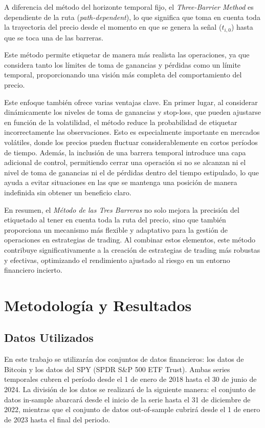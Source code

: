 \documentclass[a4paper,12pt, twoside]{report}
\begin{document}
A diferencia del método del horizonte temporal fijo, el \textit{Three-Barrier Method} 
es dependiente de la ruta (\textit{path-dependent}), lo que significa que toma en cuenta 
toda la trayectoria del precio desde el momento en que se genera la señal ($t_{i,0}$) 
hasta que se toca una de las barreras. 

Este método permite etiquetar de manera más realista las operaciones, ya que considera 
tanto los límites de toma de ganancias y pérdidas como un límite temporal, proporcionando 
una visión más completa del comportamiento del precio.

Este enfoque también ofrece varias ventajas clave. En primer lugar, al considerar 
dinámicamente los niveles de toma de ganancias y stop-loss, que pueden ajustarse en 
función de la volatilidad, el método reduce la probabilidad de etiquetar incorrectamente 
las observaciones. Esto es especialmente importante en mercados volátiles, donde los 
precios pueden fluctuar considerablemente en cortos períodos de tiempo. Además, 
la inclusión de una barrera temporal introduce una capa adicional de control, 
permitiendo cerrar una operación si no se alcanzan ni el nivel de toma de ganancias 
ni el de pérdidas dentro del tiempo estipulado, lo que ayuda a evitar situaciones en 
las que se mantenga una posición de manera indefinida sin obtener un beneficio claro.

En resumen, el \textit{Método de las Tres Barreras} no solo mejora la precisión del 
etiquetado al tener en cuenta toda la ruta del precio, sino que también proporciona 
un mecanismo más flexible y adaptativo para la gestión de operaciones en estrategias 
de trading. Al combinar estos elementos, este método contribuye significativamente a 
la creación de estrategias de trading más robustas y efectivas, optimizando el 
rendimiento ajustado al riesgo en un entorno financiero incierto.


\chapter{Metodología y Resultados}
\section{Datos Utilizados}

En este trabajo se utilizarán dos conjuntos de datos financieros: los datos de Bitcoin y los 
datos del SPY (SPDR S\&P 500 ETF Trust). Ambas series temporales cubren el período desde el 
1 de enero de 2018 hasta el 30 de junio de 2024. La división de los datos se realizará de la 
siguiente manera: el conjunto de datos in-sample abarcará desde el inicio de la serie hasta 
el 31 de diciembre de 2022, mientras que el conjunto de datos out-of-sample cubrirá desde el 
1 de enero de 2023 hasta el final del periodo.
\end{document}

